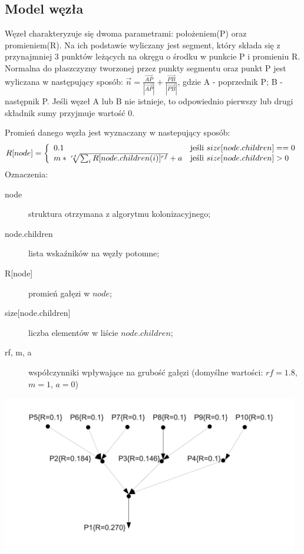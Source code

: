 \subsection{Model węzła}
Węzeł charakteryzuje się dwoma parametrami: położeniem(P) oraz promieniem(R). Na ich podstawie wyliczany jest segment, który składa się z przynajmniej 3 punktów leżących na okręgu o środku w punkcie P i promieniu R. Normalna do płaszczyzny tworzonej przez punkty segmentu oraz punkt P jest wyliczana w następujący sposób: $\vec{n}=\frac{\vec{AP}}{|\vec{AP}|}+\frac{\vec{PB}}{|\vec{PB}|}$, gdzie A - poprzednik P; B - następnik P. Jeśli węzeł A lub B nie istnieje, to odpowiednio pierwszy lub drugi składnik sumy przyjmuje wartość 0.

Promień danego węzła jest wyznaczany w nastepujący sposób:
$$
  R[node] = \left\{ 
  \begin{array}{l l}
    0.1 & \textrm{jeśli $size[node.children] == 0$}\\
    m*\sqrt[rf]{\sum_{i} R[node.children(i)]^{rf}}+a & \textrm{jeśli $size[node.children] > 0$}\\
  \end{array} \right.
$$
Oznaczenia:
\begin{description}
	\item[node] struktura otrzymana z algorytmu kolonizacyjnego;
	\item[node.children] lista wskaźników na węzły potomne;
	\item[\textrm{R[node]}] promień gałęzi w $node$;
	\item[\textrm{size[node.children]}] liczba elementów w liście $node.children$;
	\item[rf, m, a] współczynniki wpływające na grubość gałęzi (domyślne wartości: $rf=1.8$, $m=1$, $a=0$)
\end{description}

\begin{center}
	\includegraphics[width=130mm]{images/model/node_radius.pdf}
	\label{node_radius}
\end{center}


